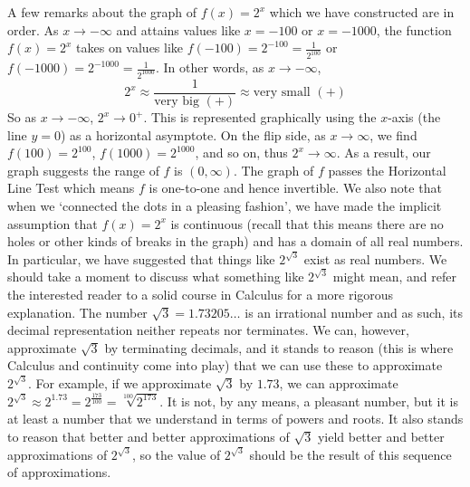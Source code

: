 A few remarks about the graph of $f(x) = 2^{x}$ which we have constructed are in order.  As $x \rightarrow -\infty$ and attains values like $x = -100$ or $x=-1000$, the function $f(x) = 2^{x}$ takes on values like $f(-100) = 2^{-100} = \frac{1}{2^{100}}$ or $f(-1000) = 2^{-1000} = \frac{1}{2^{1000}}$.  In other words, as $x \rightarrow -\infty$, \[2^{x} \approx \frac{1}{\mbox{very big $(+)$}}  \approx \mbox{very small $(+)$}\]  So as $x \rightarrow -\infty$, $2^{x} \rightarrow 0^{+}$.  This is represented graphically using the $x$-axis (the line $y = 0$) as a horizontal asymptote.  On the flip side, as $x \rightarrow \infty$, we find $f(100) = 2^{100}$, $f(1000) = 2^{1000}$, and so on, thus $2^{x} \rightarrow \infty$. As a result, our graph suggests the range of $f$ is $(0,\infty)$.  The graph of $f$ passes the Horizontal Line Test which means $f$ is one-to-one and hence invertible.  We also note that when we `connected the dots in a pleasing fashion', we have made the implicit assumption that $f(x) = 2^{x}$ is continuous (recall that this means there are no holes or other kinds of breaks in the graph) and has a domain of all real numbers.  In particular, we have suggested that things like $2^{\sqrt{3}}$ exist as real numbers.  We should take a moment to discuss what something like $2^{\sqrt{3}}$ might mean, and refer the interested reader to a solid course in Calculus for a more rigorous explanation.  The number $\sqrt{3} = 1.73205 \ldots$ is an irrational number and as such, its decimal representation neither repeats nor terminates.  We can, however, approximate $\sqrt{3}$ by terminating decimals, and it stands to reason (this is where Calculus and continuity come into play) that we can use these to approximate $2^{\sqrt{3}}$.  For example, if we approximate $\sqrt{3}$ by $1.73$, we can approximate $2^{\sqrt{3}} \approx 2^{1.73} = 2^{\frac{173}{100}} = \sqrt[100]{2^{173}}$. It is not, by any means, a pleasant number, but it is at least a number that we understand in terms of powers and roots.  It also stands to reason that better and better approximations of $\sqrt{3}$ yield better and better approximations of $2^{\sqrt{3}}$, so the value of $2^{\sqrt{3}}$ should be the result of this sequence of approximations. 



